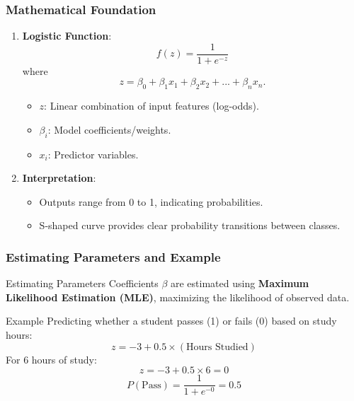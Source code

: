 \documentclass[aspectratio=169]{beamer}
\begin{document}
\begin{frame}[fragile]
    \frametitle{Mathematical Foundation}
    \begin{enumerate}
        \item \textbf{Logistic Function}:
        \begin{equation}
            f(z) = \frac{1}{1 + e^{-z}}
        \end{equation}
        where 
        \[
        z = \beta_0 + \beta_1x_1 + \beta_2x_2 + ... + \beta_nx_n.
        \]
        \begin{itemize}
            \item \( z \): Linear combination of input features (log-odds).
            \item \( \beta_i \): Model coefficients/weights.
            \item \( x_i \): Predictor variables.
        \end{itemize}
        
        \item \textbf{Interpretation}:
        \begin{itemize}
            \item Outputs range from 0 to 1, indicating probabilities.
            \item S-shaped curve provides clear probability transitions between classes.
        \end{itemize}
    \end{enumerate}
\end{frame}

\begin{frame}[fragile]
    \frametitle{Estimating Parameters and Example}
    \begin{block}{Estimating Parameters}
        Coefficients \( \beta \) are estimated using \textbf{Maximum Likelihood Estimation (MLE)}, maximizing the likelihood of observed data.
    \end{block}

    \begin{block}{Example}
        Predicting whether a student passes (1) or fails (0) based on study hours:
        \begin{equation}
            z = -3 + 0.5 \times (\text{Hours Studied})
        \end{equation}
        For 6 hours of study:
        \[
        z = -3 + 0.5 \times 6 = 0
        \]
        \[
        P(\text{Pass}) = \frac{1}{1 + e^{-0}} = 0.5
        \]
    \end{block}
\end{frame}
\end{document}
